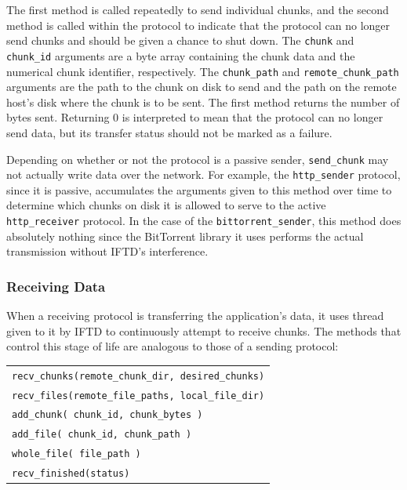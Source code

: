 The first method is called repeatedly to send individual chunks, and the second method is called within the protocol to indicate that the protocol can no longer send chunks and should be given a chance to shut down.  The \texttt{chunk} and \texttt{chunk\_id} arguments are a byte array containing the chunk data and the numerical chunk identifier, respectively.  The \texttt{chunk\_path} and \texttt{remote\_chunk\_path} arguments are the path to the chunk on disk to send and the path on the remote host's disk where the chunk is to be sent.  The first method returns the number of bytes sent.  Returning 0 is interpreted to mean that the protocol can no longer send data, but its transfer status should not be marked as a failure.

Depending on whether or not the protocol is a passive sender, \texttt{send\_chunk} may not actually write data over the network.  For example, the \texttt{http\_sender} protocol, since it is passive, accumulates the arguments given to this method over time to determine which chunks on disk it is allowed to serve to the active \texttt{http\_receiver} protocol.  In the case of the \texttt{bittorrent\_sender}, this method does absolutely nothing since the BitTorrent library it uses performs the actual transmission without IFTD's interference.

\subsubsection{Receiving Data}

When a receiving protocol is transferring the application's data, it uses thread given to it by IFTD to continuously attempt to receive chunks.  The methods that control this stage of life are analogous to those of a sending protocol:

\begin{table}[ht!]
\begin{tabular}{ l }
\indent \texttt{recv\_chunks(remote\_chunk\_dir, desired\_chunks)} \\
\indent \texttt{recv\_files(remote\_file\_paths, local\_file\_dir)} \\
\indent \texttt{add\_chunk( chunk\_id, chunk\_bytes )} \\
\indent \texttt{add\_file( chunk\_id, chunk\_path )} \\
\indent \texttt{whole\_file( file\_path )} \\
\indent \texttt{recv\_finished(status)} \\
\end{tabular}
\end{table}

